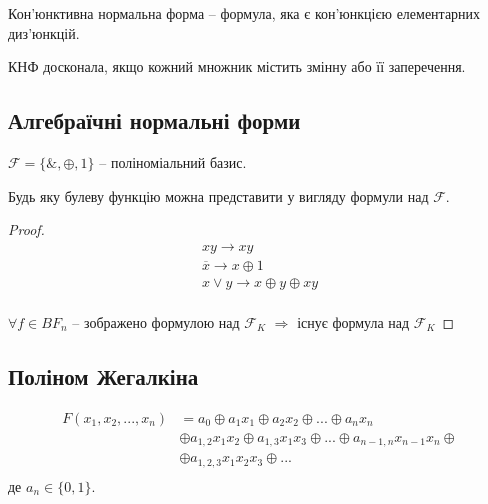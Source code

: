 \begin{definition}
    Кон'юнктивна нормальна форма -- формула, яка є кон'юнкцією елементарних диз'юнкцій.
\end{definition}

\begin{definition}
    КНФ досконала, якщо кожний множник містить змінну або її заперечення.
\end{definition}

\subsection{Алгебраїчні нормальні форми}

\begin{definition}
    $\mathcal{F} = \{\&, \oplus, 1\}$ -- поліноміальний базис.
\end{definition}

\begin{theorem}
    Будь яку булеву функцію можна представити у вигляду формули над $\mathcal{F}$.
\end{theorem}
\begin{proof}
    \begin{gather*}
        xy \rightarrow xy\\
        \overline{x} \rightarrow x \oplus 1\\
        x \vee y \rightarrow x \oplus y \oplus xy\\
    \end{gather*}

    $\forall f \in BF_n$ -- зображено формулою над $\mathcal{F}_K$ $\Rightarrow$ існує формула над $\mathcal{F}_K$
\end{proof}

\subsection{Поліном Жегалкіна}

\begin{equation*}
    \begin{split}
        F(x_1, x_2, ..., x_n)
        & = a_0 \oplus a_1 x_1 \oplus a_2 x_2 \oplus ... \oplus a_n x_n \\
        & \oplus a_{1, 2} x_1 x_2 \oplus a_{1, 3} x_1 x_3 \oplus ... \oplus a_{n - 1, n} x_{n - 1} x_n \oplus \\
        & \oplus a_{1, 2, 3} x_1 x_2 x_3 \oplus ...  \\
    \end{split}
\end{equation*}
де $a_n \in \{0, 1\}$.

